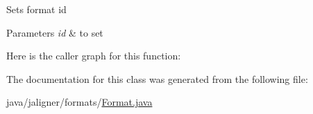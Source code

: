Sets format id 
\begin{DoxyParams}{Parameters}
{\em id} & to set \\
\hline
\end{DoxyParams}


Here is the caller graph for this function\+:




The documentation for this class was generated from the following file\+:\begin{DoxyCompactItemize}
\item 
java/jaligner/formats/\hyperlink{_format_8java}{Format.\+java}\end{DoxyCompactItemize}
